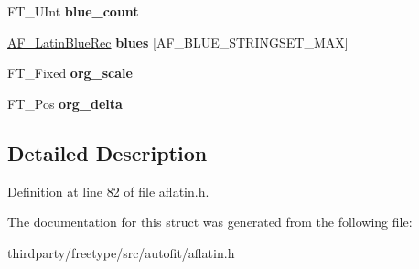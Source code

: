 \begin{DoxyCompactItemize}
F\+T\+\_\+\+U\+Int {\bfseries blue\+\_\+count}
\item 
\mbox{\label{struct_a_f___latin_axis_rec___a059bb47dbff0c76c97a2db7515e4ecd3}} 
\hyperlink{struct_a_f___latin_blue_rec__}{A\+F\+\_\+\+Latin\+Blue\+Rec} {\bfseries blues} \mbox{[}A\+F\+\_\+\+B\+L\+U\+E\+\_\+\+S\+T\+R\+I\+N\+G\+S\+E\+T\+\_\+\+M\+AX\mbox{]}
\item 
\mbox{\label{struct_a_f___latin_axis_rec___af10e9ef56fa7ab822cb0fa2018e8d274}} 
F\+T\+\_\+\+Fixed {\bfseries org\+\_\+scale}
\item 
\mbox{\label{struct_a_f___latin_axis_rec___ab9a5465753042f1ead45b9c404b5de7f}} 
F\+T\+\_\+\+Pos {\bfseries org\+\_\+delta}
\end{DoxyCompactItemize}


\subsection{Detailed Description}


Definition at line 82 of file aflatin.\+h.



The documentation for this struct was generated from the following file\+:\begin{DoxyCompactItemize}
\item 
thirdparty/freetype/src/autofit/aflatin.\+h\end{DoxyCompactItemize}
